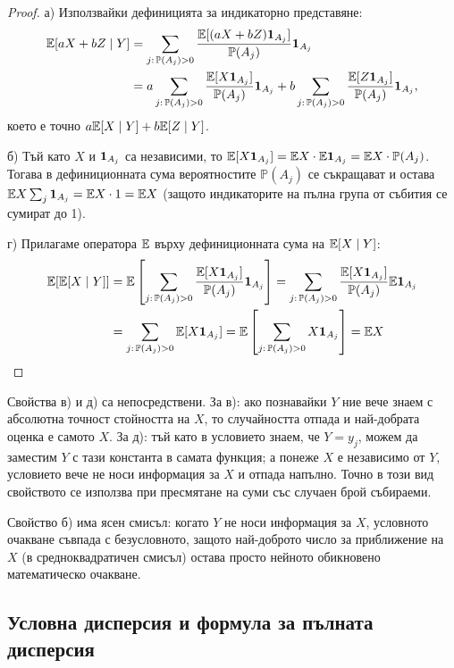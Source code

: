\begin{proof}
а) Използвайки дефиницията за индикаторно представяне:
\begin{align*}
\mathbb{E}[aX + bZ \mid Y]
  &= \sum_{j:\,\mathbb{P}(A_j)>0} \frac{\mathbb{E}[(aX+bZ)\mathbf{1}_{A_j}]}{\mathbb{P}(A_j)}\mathbf{1}_{A_j} \\
  &= a \sum_{j:\,\mathbb{P}(A_j)>0} \frac{\mathbb{E}[X\mathbf{1}_{A_j}]}{\mathbb{P}(A_j)}\mathbf{1}_{A_j}
   + b \sum_{j:\,\mathbb{P}(A_j)>0} \frac{\mathbb{E}[Z\mathbf{1}_{A_j}]}{\mathbb{P}(A_j)}\mathbf{1}_{A_j} ,
\end{align*}
което е точно $a\mathbb{E}[X \mid Y] + b\mathbb{E}[Z \mid Y]$.

б) Тъй като $X$ и $\mathbf{1}_{A_j}$ са независими, то $\mathbb{E}[X\mathbf{1}_{A_j}] = \mathbb{E} X \cdot \mathbb{E}\mathbf{1}_{A_j} = \mathbb{E} X \cdot \mathbb{P}(A_j)$. Тогава в дефиниционната сума вероятностите $\mathbb{P}(A_j)$ се съкращават и остава $\mathbb{E} X \sum_j \mathbf{1}_{A_j} = \mathbb{E} X \cdot 1 = \mathbb{E} X$ (защото индикаторите на пълна група от събития се сумират до 1).

г) Прилагаме оператора $\mathbb{E}$ върху дефиниционната сума на $\mathbb{E}[X\mid Y]$:
\begin{align*}
\mathbb{E}[\mathbb{E}[X\mid Y]]
  &= \mathbb{E}\left[\sum_{j:\,\mathbb{P}(A_j)>0} \frac{\mathbb{E}[X\mathbf{1}_{A_j}]}{\mathbb{P}(A_j)} \mathbf{1}_{A_j}\right]
   = \sum_{j:\,\mathbb{P}(A_j)>0} \frac{\mathbb{E}[X\mathbf{1}_{A_j}]}{\mathbb{P}(A_j)} \mathbb{E}\mathbf{1}_{A_j} \\
  &= \sum_{j:\,\mathbb{P}(A_j)>0} \mathbb{E}[X\mathbf{1}_{A_j}]
   = \mathbb{E}\left[\sum_{j:\,\mathbb{P}(A_j)>0} X\mathbf{1}_{A_j}\right] = \mathbb{E} X
\end{align*}
\end{proof}

Свойства в) и д) са непосредствени. За в): ако познавайки $Y$ ние вече знаем с абсолютна точност стойността на $X$, то случайността отпада и най-добрата оценка е самото $X$. За д): тъй като в условието знаем, че $Y=y_j$, можем да заместим $Y$ с тази константа в самата функция; а понеже $X$ е независимо от $Y$, условието вече не носи информация за $X$ и отпада напълно. Точно в този вид свойството се използва при пресмятане на суми със случаен брой събираеми.

Свойство б) има ясен смисъл: когато $Y$ не носи информация за $X$, условното очакване съвпада с безусловното, защото най-доброто число за приближение на $X$ (в средноквадратичен смисъл) остава просто нейното обикновено математическо очакване.

\subsection{Условна дисперсия и формула за пълната дисперсия}

